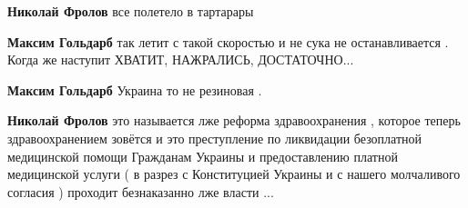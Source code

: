 \begin{itemize}
\begin{itemize}
 
\textbf{Николай Фролов} все полетело в тартарары

 
\textbf{Максим Гольдарб} так летит с такой скоростью и не сука не останавливается . Когда же наступит ХВАТИТ, НАЖРАЛИСЬ, ДОСТАТОЧНО...

 
\textbf{Максим Гольдарб} Украина то не резиновая .

 
\textbf{Николай Фролов} это называется лже реформа здравоохранения , которое
теперь здравоохранением зовётся и это преступление по ликвидации безоплатной
медицинской помощи Гражданам Украины и предоставлению платной медицинской
услуги ( в разрез с Конституцией Украины и с нашего молчаливого согласия )
проходит безнаказанно лже власти ...

\end{itemize}

 


\end{itemize}

